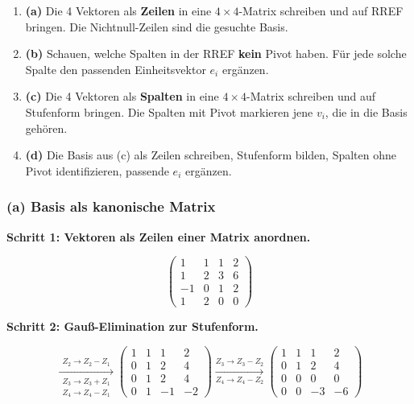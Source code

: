 \documentclass[a4paper,12pt]{article}
\begin{document}
\begin{wastun}
\begin{enumerate}[leftmargin=*, nosep]
    \item \textbf{(a)} Die 4 Vektoren als \textbf{Zeilen} in eine $4 \times 4$-Matrix schreiben und auf RREF bringen. Die Nichtnull-Zeilen sind die gesuchte Basis.
    \item \textbf{(b)} Schauen, welche Spalten in der RREF \textbf{kein} Pivot haben. F\"ur jede solche Spalte den passenden Einheitsvektor $e_i$ erg\"anzen.
    \item \textbf{(c)} Die 4 Vektoren als \textbf{Spalten} in eine $4 \times 4$-Matrix schreiben und auf Stufenform bringen. Die Spalten mit Pivot markieren jene $v_i$, die in die Basis geh\"oren.
    \item \textbf{(d)} Die Basis aus (c) als Zeilen schreiben, Stufenform bilden, Spalten ohne Pivot identifizieren, passende $e_i$ erg\"anzen.
\end{enumerate}
\end{wastun}

\subsubsection*{(a) Basis als kanonische Matrix}

\textbf{Schritt 1: Vektoren als Zeilen einer Matrix anordnen.}

\[
\left(\begin{array}{cccc}
1 & 1 & 1 & 2 \\
1 & 2 & 3 & 6 \\
-1 & 0 & 1 & 2 \\
1 & 2 & 0 & 0
\end{array}\right)
\]

\textbf{Schritt 2: Gau\ss-Elimination zur Stufenform.}

\[
\xrightarrow[\substack{Z_3 \to Z_3 + Z_1 \\ Z_4 \to Z_4 - Z_1}]{Z_2 \to Z_2 - Z_1}
\left(\begin{array}{cccc}
1 & 1 & 1 & 2 \\
0 & 1 & 2 & 4 \\
0 & 1 & 2 & 4 \\
0 & 1 & -1 & -2
\end{array}\right)
\xrightarrow[Z_4 \to Z_4 - Z_2]{Z_3 \to Z_3 - Z_2}
\left(\begin{array}{cccc}
1 & 1 & 1 & 2 \\
0 & 1 & 2 & 4 \\
0 & 0 & 0 & 0 \\
0 & 0 & -3 & -6
\end{array}\right)
\]
\end{document}
